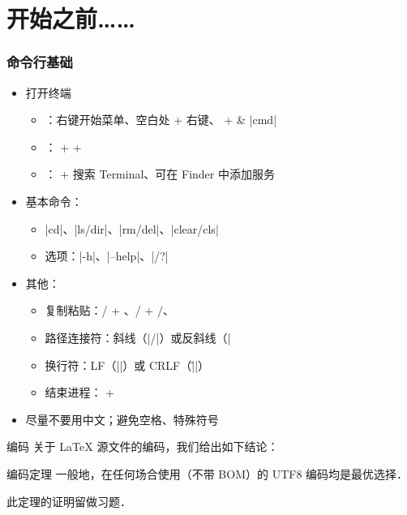 \section{开始之前……}

\begin{frame}[fragile]
\frametitle{命令行基础}
\begin{itemize}
  \item 打开终端

    \begin{itemize}
      \item \faWindows{}：右键开始菜单、空白处  + 右键、 +  \& |cmd|
      \item \faLinux{}： +  + 
      \item \faApple{}： +  搜索 Terminal、可在 Finder 中添加服务
    \end{itemize}

  \item 基本命令：

    \begin{itemize}
      \item |cd|、|ls/dir|、|rm/del|、|clear/cls|
      \item 选项：|-h|、|--help|、|/?|
    \end{itemize}

  \item 其他：

    \begin{itemize}
      \item 复制粘贴：/ + 、/ + /、
      \item 路径连接符：斜线（|/|）或反斜线（|\|）
      \item 换行符：LF（|\n|）或 CRLF（|\r\n|）
      \item 结束进程： + 
    \end{itemize} \pause

  \item \alert{尽量不要用中文；避免空格、特殊符号}
\end{itemize}
\end{frame}

\begin{frame}{编码}
关于 \LaTeX{} 源文件的编码，我们给出如下结论：\pause
\begin{alertblock}{编码定理}
  一般地，在任何场合使用（不带 BOM）的 \alert{UTF\CASE{-}8} 编码均是最优选择．
\end{alertblock} \pause
此定理的证明留做习题．
\end{frame}
